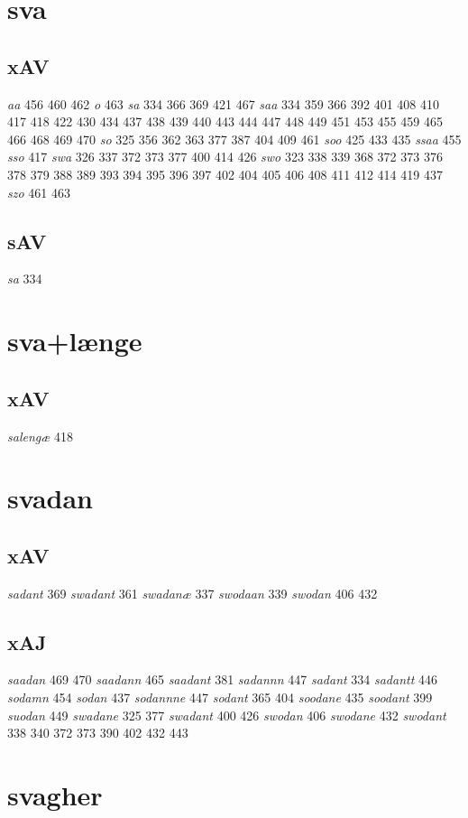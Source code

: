 \documentclass[a4paper,twocolumn]{article}
\begin{document}
\section{sva}
\label{sec:org3d6ce7a}
\subsection{xAV}
\label{sec:org9c72d63}
\emph{aa} 456 460 462 \emph{o} 463 \emph{sa} 334 366 369 421 467 \emph{saa} 334 359 366 392 401 408 410 417 418 422 430 434 437 438 439 440 443 444 447 448 449 451 453 455 459 465 466 468 469 470 \emph{so} 325 356 362 363 377 387 404 409 461 \emph{soo} 425 433 435 \emph{ssaa} 455 \emph{sso} 417 \emph{swa} 326 337 372 373 377 400 414 426 \emph{swo} 323 338 339 368 372 373 376 378 379 388 389 393 394 395 396 397 402 404 405 406 408 411 412 414 419 437 \emph{szo} 461 463 
\subsection{sAV}
\label{sec:org259ca59}
\emph{sa} 334 
\section{sva+længe}
\label{sec:org4e93cba}
\subsection{xAV}
\label{sec:org47ee55a}
\emph{salengæ} 418 
\section{svadan}
\label{sec:orga0745f4}
\subsection{xAV}
\label{sec:orgb63823f}
\emph{sadant} 369 \emph{swadant} 361 \emph{swadanæ} 337 \emph{swodaan} 339 \emph{swodan} 406 432 
\subsection{xAJ}
\label{sec:orgdf965e2}
\emph{saadan} 469 470 \emph{saadann} 465 \emph{saadant} 381 \emph{sadannn} 447 \emph{sadant} 334 \emph{sadantt} 446 \emph{sodamn} 454 \emph{sodan} 437 \emph{sodannne} 447 \emph{sodant} 365 404 \emph{soodane} 435 \emph{soodant} 399 \emph{suodan} 449 \emph{swadane} 325 377 \emph{swadant} 400 426 \emph{swodan} 406 \emph{swodane} 432 \emph{swodant} 338 340 372 373 390 402 432 443 
\section{svagher}
\label{sec:org9ab3660}
\end{document}
